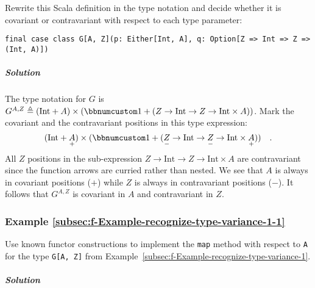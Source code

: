 Rewrite this Scala definition in the type notation and decide whether
it is covariant or contravariant with respect to each type parameter:

\begin{lstlisting}
final case class G[A, Z](p: Either[Int, A], q: Option[Z => Int => Z => (Int, A)])
\end{lstlisting}


\subparagraph{Solution}

The type notation for $G$ is $G^{A,Z}\triangleq(\text{Int}+A)\times(\bbnum 1+(Z\rightarrow\text{Int}\rightarrow Z\rightarrow\text{Int}\times A))$.
Mark the covariant and the contravariant positions in this type expression:
\[
(\text{Int}+\underset{+}{A})\times(\bbnum 1+(\underset{-}{Z}\rightarrow\text{Int}\rightarrow\underset{-}{Z}\rightarrow\text{Int}\times\underset{+}{A}))\quad.
\]
All $Z$ positions in the sub-expression $Z\rightarrow\text{Int}\rightarrow Z\rightarrow\text{Int}\times A$
are contravariant since the function arrows are curried rather than
nested. We see that $A$ is always in covariant positions ($+$) while
$Z$ is always in contravariant positions ($-$). It follows that
$G^{A,Z}$ is covariant in $A$ and contravariant in $Z$. 

\subsubsection{Example \label{subsec:f-Example-recognize-type-variance-1-1}\ref{subsec:f-Example-recognize-type-variance-1-1}}

Use known functor constructions to implement the \lstinline!map!
method with respect to \lstinline!A! for the type \lstinline!G[A, Z]!
from Example~\ref{subsec:f-Example-recognize-type-variance-1}.

\subparagraph{Solution}

